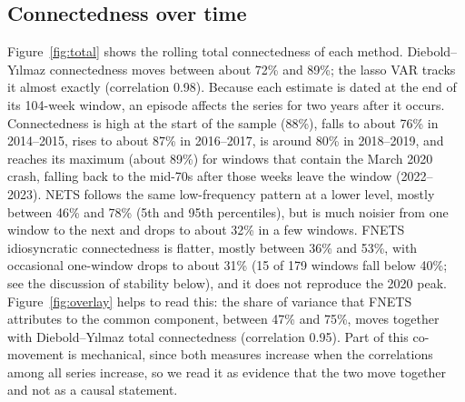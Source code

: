 \subsection{Connectedness over time}
Figure~\ref{fig:total} shows the rolling total connectedness of each method. Diebold--Y{\i}lmaz connectedness moves between about 72\% and 89\%; the lasso VAR tracks it almost exactly (correlation 0.98). Because each estimate is dated at the end of its 104-week window, an episode affects the series for two years after it occurs. Connectedness is high at the start of the sample (88\%), falls to about 76\% in 2014--2015, rises to about 87\% in 2016--2017, is around 80\% in 2018--2019, and reaches its maximum (about 89\%) for windows that contain the March 2020 crash, falling back to the mid-70s after those weeks leave the window (2022--2023). NETS follows the same low-frequency pattern at a lower level, mostly between 46\% and 78\% (5th and 95th percentiles), but is much noisier from one window to the next and drops to about 32\% in a few windows. FNETS idiosyncratic connectedness is flatter, mostly between 36\% and 53\%, with occasional one-window drops to about 31\% (15 of 179 windows fall below 40\%; see the discussion of stability below), and it does not reproduce the 2020 peak. Figure~\ref{fig:overlay} helps to read this: the share of variance that FNETS attributes to the common component, between 47\% and 75\%, moves together with Diebold--Y{\i}lmaz total connectedness (correlation 0.95). Part of this co-movement is mechanical, since both measures increase when the correlations among all series increase, so we read it as evidence that the two move together and not as a causal statement.

